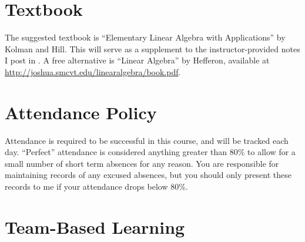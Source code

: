 \documentclass{article}
\begin{document}
\section*{\fontsize{12}{15}\selectfont Textbook}
The suggested textbook is ``Elementary Linear Algebra with Applications'' by Kolman and Hill.  This will serve as a supplement to the instructor-provided notes I post in \LMS.  A free alternative is ``Linear Algebra'' by Hefferon, available at \url{http://joshua.smcvt.edu/linearalgebra/book.pdf}.


\section*{\fontsize{12}{15}\selectfont Attendance Policy}
Attendance is required to be successful in this course, and will be tracked each day.
``Perfect'' attendance is considered anything greater than 80\%
to allow for a small number of short term absences for any reason.
You are responsible for maintaining records of any excused absences,
but you should only present these records to me if your attendance drops
below 80\%.


    \section*{\fontsize{12}{15}\selectfont Team-Based Learning}
\end{document}
